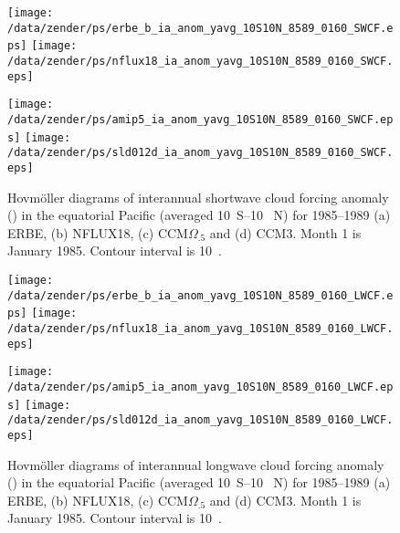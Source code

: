 \documentclass[twocolumn,final,11pt]{article}
\begin{document}
\begin{figure*}
\begin{center}
\texttt{[image: /data/zender/ps/erbe\_b\_ia\_anom\_yavg\_10S10N\_8589\_0160\_SWCF.eps]}%
\texttt{[image: /data/zender/ps/nflux18\_ia\_anom\_yavg\_10S10N\_8589\_0160\_SWCF.eps]}%

\texttt{[image: /data/zender/ps/amip5\_ia\_anom\_yavg\_10S10N\_8589\_0160\_SWCF.eps]}%
\texttt{[image: /data/zender/ps/sld012d\_ia\_anom\_yavg\_10S10N\_8589\_0160\_SWCF.eps]}%
\end{center}
\caption[Hovm\"oller diagrams of interannual shortwave cloud forcing
anomaly in the equatorial Pacific for 1985--1989 ERBE, NFLUX18,
CCM$\Omega_{.5}$, and CCM3]{  
Hovm\"oller diagrams of interannual shortwave cloud forcing anomaly
(\wxmS) in the equatorial Pacific (averaged 10~\degreee S--10~\degreee
N) for 1985--1989 (a) ERBE, (b) NFLUX18, (c) CCM$\Omega_{.5}$ and (d)
CCM3. 
Month 1 is January 1985.  
Contour interval is 10~\wxmS. 
\label{fig:ia_anom_yavg_10S10N_8589_0160_SWCF}}
\end{figure*}
\clearpage

\begin{figure*}
\begin{center}
\texttt{[image: /data/zender/ps/erbe\_b\_ia\_anom\_yavg\_10S10N\_8589\_0160\_LWCF.eps]}%
\texttt{[image: /data/zender/ps/nflux18\_ia\_anom\_yavg\_10S10N\_8589\_0160\_LWCF.eps]}%

\texttt{[image: /data/zender/ps/amip5\_ia\_anom\_yavg\_10S10N\_8589\_0160\_LWCF.eps]}%
\texttt{[image: /data/zender/ps/sld012d\_ia\_anom\_yavg\_10S10N\_8589\_0160\_LWCF.eps]}%
\end{center}
\caption[Hovm\"oller diagrams of interannual longwave cloud forcing
anomaly in the equatorial Pacific for 1985--1989 ERBE, NFLUX18,
CCM$\Omega_{.5}$, and CCM3]{ 
Hovm\"oller diagrams of interannual longwave cloud forcing anomaly
(\wxmS) in the equatorial Pacific (averaged 10~\degreee S--10~\degreee
N) for 1985--1989 (a) ERBE, (b) NFLUX18, (c) CCM$\Omega_{.5}$ and (d)
CCM3. 
Month 1 is January 1985.  
Contour interval is 10~\wxmS. 
\label{fig:ia_anom_yavg_10S10N_8589_0160_LWCF}}
\end{figure*}
\clearpage

\end{document}
